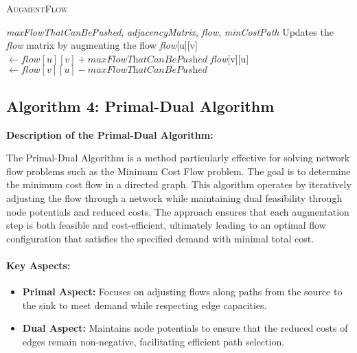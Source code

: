 \documentclass{article}
\begin{document}
\begin{algorithm}[H]
\caption{\textcolor{keywordcolor}{\textsc{AugmentFlow}}}
\begin{algorithmic}[1]
\State {} \textit{maxFlowThatCanBePushed}, \textit{adjacencyMatrix}, \textit{flow}, \textit{minCostPath}
\State {} Updates the \textit{flow} matrix by augmenting the flow
        \State \textit{flow}[u][v] $\gets \textit{flow}[u][v] + \textit{maxFlowThatCanBePushed}$
        \State \textit{flow}[v][u] $\gets \textit{flow}[v][u] - \textit{maxFlowThatCanBePushed}$
    \EndIf
\EndFor
\end{algorithmic}
\end{algorithm}

\subsection{Algorithm 4: Primal-Dual Algorithm}

\textbf{Description of the Primal-Dual Algorithm:}

The Primal-Dual Algorithm is a method particularly effective for solving network flow problems such as the Minimum Cost Flow problem. The goal is to determine the minimum cost flow in a directed graph. This algorithm operates by iteratively adjusting the flow through a network while maintaining dual feasibility through node potentials and reduced costs. The approach ensures that each augmentation step is both feasible and cost-efficient, ultimately leading to an optimal flow configuration that satisfies the specified demand with minimal total cost.~\cite{topcoder, primaldual}

\paragraph{Key Aspects:}
\begin{itemize}
    \item \textbf{Primal Aspect:} Focuses on adjusting flows along paths from the source to the sink to meet demand while respecting edge capacities.
    \item \textbf{Dual Aspect:} Maintains node potentials to ensure that the reduced costs of edges remain non-negative, facilitating efficient path selection.
\end{itemize}
\end{document}
